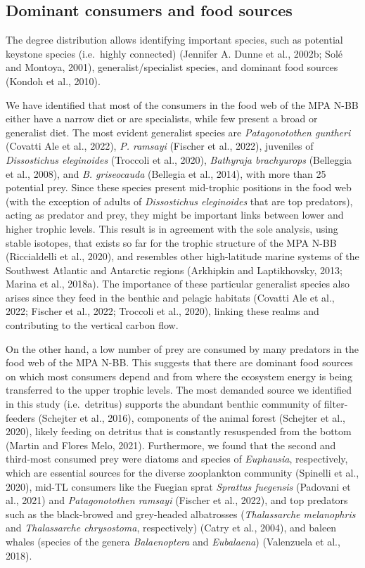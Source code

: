 \documentclass[preprint, 3p,
authoryear]{elsarticle} %
\begin{document}
\hypertarget{dominant-consumers-and-food-sources}{%
\subsection{Dominant consumers and food
sources}\label{dominant-consumers-and-food-sources}}

The degree distribution allows identifying important species, such as
potential keystone species (i.e.~highly connected) (Jennifer A. Dunne et
al., 2002b; Solé and Montoya, 2001), generalist/specialist species, and
dominant food sources (Kondoh et al., 2010).

We have identified that most of the consumers in the food web of the MPA
N-BB either have a narrow diet or are specialists, while few present a
broad or generalist diet. The most evident generalist species are
\emph{Patagonotothen guntheri} (Covatti Ale et al., 2022), \emph{P.
ramsayi} (Fischer et al., 2022), juveniles of \emph{Dissostichus
eleginoides} (Troccoli et al., 2020), \emph{Bathyraja brachyurops}
(Belleggia et al., 2008), and \emph{B. griseocauda} (Bellegia et al.,
2014), with more than 25 potential prey. Since these species present
mid-trophic positions in the food web (with the exception of adults of
\emph{Dissostichus eleginoides} that are top predators), acting as
predator and prey, they might be important links between lower and
higher trophic levels. This result is in agreement with the sole
analysis, using stable isotopes, that exists so far for the trophic
structure of the MPA N-BB (Riccialdelli et al., 2020), and resembles
other high-latitude marine systems of the Southwest Atlantic and
Antarctic regions (Arkhipkin and Laptikhovsky, 2013; Marina et al.,
2018a). The importance of these particular generalist species also
arises since they feed in the benthic and pelagic habitats (Covatti Ale
et al., 2022; Fischer et al., 2022; Troccoli et al., 2020), linking
these realms and contributing to the vertical carbon flow.

On the other hand, a low number of prey are consumed by many predators
in the food web of the MPA N-BB. This suggests that there are dominant
food sources on which most consumers depend and from where the ecosystem
energy is being transferred to the upper trophic levels. The most
demanded source we identified in this study (i.e.~detritus) supports the
abundant benthic community of filter-feeders (Schejter et al., 2016),
components of the animal forest (Schejter et al., 2020), likely feeding
on detritus that is constantly resuspended from the bottom (Martin and
Flores Melo, 2021). Furthermore, we found that the second and third-most
consumed prey were diatoms and species of \emph{Euphausia},
respectively, which are essential sources for the diverse zooplankton
community (Spinelli et al., 2020), mid-TL consumers like the Fuegian
sprat \emph{Sprattus fuegensis} (Padovani et al., 2021) and
\emph{Patagonotothen ramsayi} (Fischer et al., 2022), and top predators
such as the black-browed and grey-headed albatrosses (\emph{Thalassarche
melanophris} and \emph{Thalassarche chrysostoma}, respectively) (Catry
et al., 2004), and baleen whales (species of the genera
\emph{Balaenoptera} and \emph{Eubalaena}) (Valenzuela et al., 2018).
\end{document}
